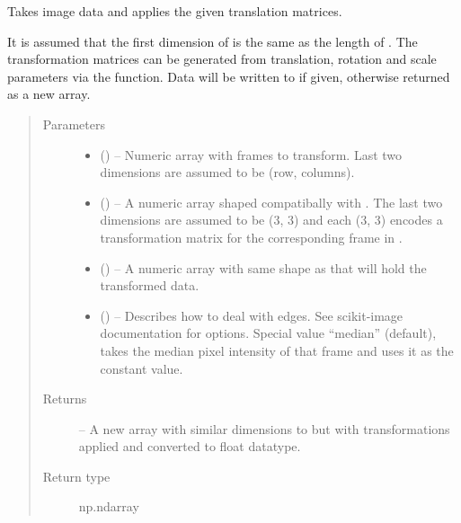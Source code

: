 \documentclass[letterpaper,10pt,english]{sphinxmanual}
\begin{document}

\begin{fulllineitems}
\label{\detokenize{xanespy:xanespy.xanes_math.transform_images}}
Takes image data and applies the given translation matrices.

It is assumed that the first dimension of  is the same as
the length of . The transformation matrices can
be generated from translation, rotation and scale parameters via
the 
function. Data will be written to  if given, otherwise
returned as a new array.
\begin{quote}\begin{description}
\item[{Parameters}] \leavevmode\begin{itemize}
\item {} 
 () -- Numeric array with frames to transform. Last two dimensions are
assumed to be (row, columns).

\item {} 
 () -- A numeric array shaped compatibally with . The last two
dimensions are assumed to be (3, 3) and each (3, 3) encodes a
transformation matrix for the corresponding frame in .

\item {} 
 (\sphinxstyleliteralemphasis{, }) -- A numeric array with same shape as  that will hold the
transformed data.

\item {} 
 (\sphinxstyleliteralemphasis{, }) -- Describes how to deal with edges. See scikit-image documentation
for options. Special value ``median'' (default), takes the median
pixel intensity of that frame and uses it as the constant value.

\end{itemize}

\item[{Returns}] \leavevmode
{} -- A new array with similar dimensions to  but with
transformations applied and converted to float datatype.

\item[{Return type}] \leavevmode
np.ndarray

\end{description}\end{quote}

\end{fulllineitems}
\end{document}
